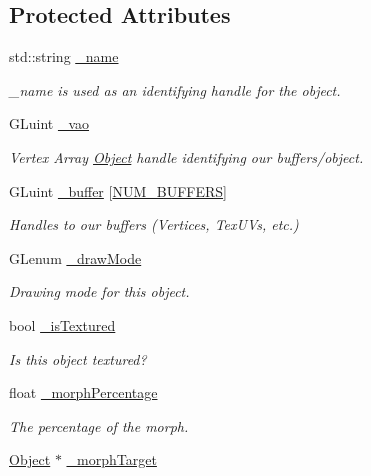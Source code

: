 \subsection*{Protected Attributes}
\begin{DoxyCompactItemize}
\item 
std\-::string \hyperlink{class_object_a3f617214b260ebbe394e7c7b08ab5e43}{\-\_\-name}
\begin{DoxyCompactList}\small\item\em \-\_\-name is used as an identifying handle for the object. \end{DoxyCompactList}\item 
G\-Luint \hyperlink{class_object_a564aa6b1df66a05ab6b6c2f071851c4e}{\-\_\-vao}
\begin{DoxyCompactList}\small\item\em Vertex Array \hyperlink{class_object}{Object} handle identifying our buffers/object. \end{DoxyCompactList}\item 
\hypertarget{class_object_adf8365e2c661ab4014c3dbf60e48572b}{G\-Luint \hyperlink{class_object_adf8365e2c661ab4014c3dbf60e48572b}{\-\_\-buffer} \mbox{[}\hyperlink{class_object_a74a39247838865244defd0ae9712df9ba1999a38dc687c7ae05c884078de39b51}{N\-U\-M\-\_\-\-B\-U\-F\-F\-E\-R\-S}\mbox{]}}\label{class_object_adf8365e2c661ab4014c3dbf60e48572b}

\begin{DoxyCompactList}\small\item\em Handles to our buffers (Vertices, Tex\-U\-Vs, etc.) \end{DoxyCompactList}\item 
G\-Lenum \hyperlink{class_object_ae8457eabfb89d55826142508013b56c0}{\-\_\-draw\-Mode}
\begin{DoxyCompactList}\small\item\em Drawing mode for this object. \end{DoxyCompactList}\item 
\hypertarget{class_object_abcb877094b696561a49bc931c5a12d9f}{bool \hyperlink{class_object_abcb877094b696561a49bc931c5a12d9f}{\-\_\-is\-Textured}}\label{class_object_abcb877094b696561a49bc931c5a12d9f}

\begin{DoxyCompactList}\small\item\em Is this object textured? \end{DoxyCompactList}\item 
float \hyperlink{class_object_a7fbbac9027e1a8266342bd5ce064120d}{\-\_\-morph\-Percentage}
\begin{DoxyCompactList}\small\item\em The percentage of the morph. \end{DoxyCompactList}\item 
\hypertarget{class_object_a5baa9891bd4981d62b4e86a1c2a8eea7}{\hyperlink{class_object}{Object} $\ast$ \hyperlink{class_object_a5baa9891bd4981d62b4e86a1c2a8eea7}{\-\_\-morph\-Target}}\label{class_object_a5baa9891bd4981d62b4e86a1c2a8eea7}


\end{DoxyCompactItemize}
